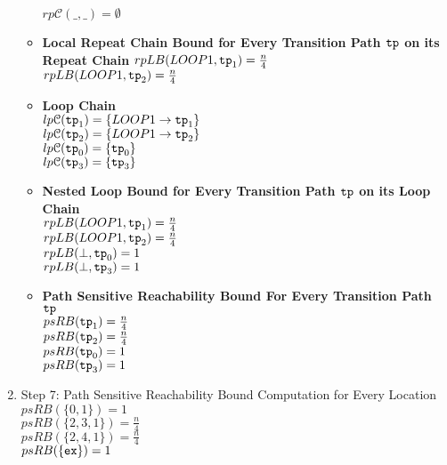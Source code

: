 \begin{enumerate}
\begin{itemize}
      $rp\mathcal{C}(\_, \_) = \emptyset$ 
      \item \textbf{{Local Repeat Chain Bound} for Every Transition Path $\mathtt{tp}$ on its Repeat Chain}
      $rpLB(LOOP1, \mathtt{tp}_1) = \frac{n}{4}$ \\
      $rpLB(LOOP1, \mathtt{tp}_2) = \frac{n}{4}$ 
      \item \textbf{Loop Chain}
      \\
      $lp\mathcal{C}(\mathtt{tp}_1) = \{LOOP1\to \mathtt{tp}_1\}$ \\
      $lp\mathcal{C}(\mathtt{tp}_2) = \{LOOP1\to \mathtt{tp}_2\}$ \\
      $lp\mathcal{C}(\mathtt{tp}_0) = \{\mathtt{tp}_0\}$ \\
      $lp\mathcal{C}(\mathtt{tp}_3) = \{\mathtt{tp}_3\}$ 
      \item \textbf{Nested Loop Bound for Every Transition Path $\mathtt{tp}$ on its Loop Chain}
      \\
      $rpLB(LOOP1, \mathtt{tp}_1) = \frac{n}{4}$ \\
      $rpLB(LOOP1, \mathtt{tp}_2) = \frac{n}{4}$  \\
      $rpLB(\bot, \mathtt{tp}_0) = 1$ \\
      $rpLB(\bot, \mathtt{tp}_3) = 1$ 
      \item \textbf{Path Sensitive Reachability Bound For Every Transition Path $\mathtt{tp}$ }
      \\
      $psRB(\mathtt{tp}_1) = \frac{n}{4}$ \\
      $psRB(\mathtt{tp}_2) = \frac{n}{4}$ \\
      $psRB(\mathtt{tp}_0) = 1$ \\
      $psRB(\mathtt{tp}_3) = 1$ 
    \end{itemize}
    \item Step 7: Path Sensitive Reachability Bound Computation for Every Location
    \\
    $psRB(\{0, 1\}) = 1$ \\
    $psRB(\{2, 3, 1 \}) = \frac{n}{4}$ \\
    $psRB(\{2, 4, 1\}) = \frac{n}{4}$ \\
    $psRB(\{\mathtt{ex}\}) = 1$ 
    \end{enumerate}

